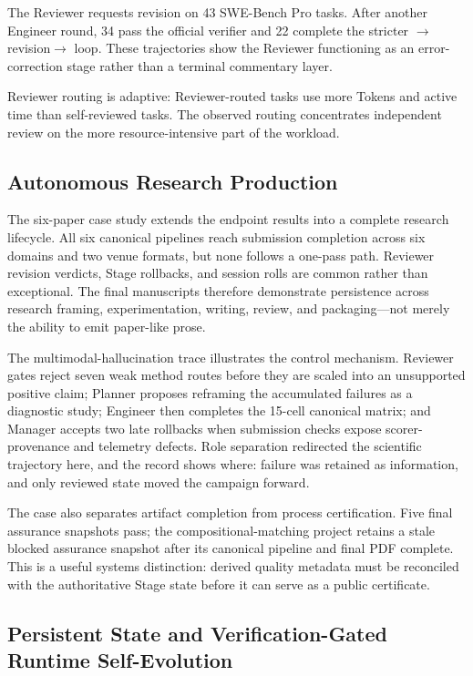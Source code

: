 The Reviewer requests revision on 43 SWE-Bench Pro tasks. After another Engineer
round, 34 pass the official verifier and 22 complete the stricter
$\rightarrow$revision$\rightarrow$ loop. These trajectories
show the Reviewer functioning as an error-correction stage rather than a terminal
commentary layer.

Reviewer routing is adaptive: Reviewer-routed tasks use more Tokens and active time
than self-reviewed tasks. The observed routing concentrates independent review on
the more resource-intensive part of the workload.

\subsection{Autonomous Research Production}

The six-paper case study extends the endpoint results into a complete research
lifecycle. All six canonical pipelines reach submission completion across six
domains and two venue formats, but none follows a one-pass path. Reviewer revision
verdicts, Stage rollbacks, and session rolls are common rather than exceptional.
The final manuscripts therefore demonstrate persistence across research framing,
experimentation, writing, review, and packaging---not merely the ability to emit
paper-like prose.

The multimodal-hallucination trace illustrates the control mechanism. Reviewer
gates reject seven weak method routes before they are scaled into an unsupported
positive claim; Planner proposes reframing the accumulated failures as a diagnostic study;
Engineer then completes the 15-cell canonical matrix; and Manager accepts two late
rollbacks when submission checks expose scorer-provenance and telemetry defects.
Role separation redirected the scientific trajectory here, and the record shows
where: failure was retained as information, and only reviewed state moved the
campaign forward.

The case also separates artifact completion from process certification. Five final
assurance snapshots pass; the compositional-matching project retains a stale blocked
assurance snapshot after its canonical pipeline and final PDF complete. This is a
useful systems distinction: derived quality metadata must be reconciled with the
authoritative Stage state before it can serve as a public certificate.

\subsection{Persistent State and Verification-Gated Runtime Self-Evolution}

